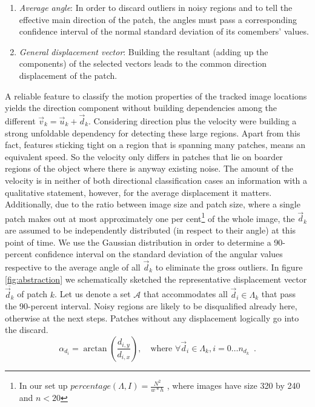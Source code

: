 \begin{enumerate}
	\item \textit{Average angle}: In order to discard outliers in noisy regions and to tell the effective main direction of the patch, the angles must pass a corresponding confidence interval of the normal standard deviation of its comembers' values.
	\item \textit{General displacement vector}: Building the resultant (adding up the components) of the selected vectors leads to the common direction displacement of the patch.
\end{enumerate}
%
A reliable feature to classify the motion properties of the tracked image locations yields the direction component without building dependencies among the different $ \vec{v}_k = \vec{u}_k + \vec{d}_k $. Considering direction plus the velocity were building a strong unfoldable dependency for detecting these large regions. Apart from this fact, features sticking tight on a region that is spanning many patches, means an equivalent speed. So the velocity only differs in patches that lie on boarder regions of the object where there is anyway existing noise. The amount of the velocity is in neither of both directional classification cases an information with a qualitative statement, however, for the average displacement it matters. Additionally, due to the ratio between image size and patch size, where a single patch makes out at most approximately one per cent\footnote{In our set up $ percentage \left(  \Lambda, I \right) = \frac{N^2}{w*h}$ , where images have size 320 by 240 and $n < 20$ } of the whole image, the $ \vec{d}_k $ are assumed to be independently distributed  (in respect to their angle) at this point of time. We use the Gaussian distribution in order to determine a 90-percent confidence interval on the standard deviation of the angular values respective to the average angle of all $\vec{d}_k $ to eliminate the gross outliers. In figure \ref{fig:abstraction} we schematically sketched the representative displacement vector $\overline{\vec{d}_k}$ of patch $k$. Let us denote a set $\mathcal{A}$ that accommodates all $\vec{d}_i \in \Lambda_k$ that pass the 90-percent interval.%
Noisy regions are likely to be disqualified already here, otherwise at the next steps. Patches without any displacement logically go into the discard. 
\begin{equation}
	\alpha_{d_i} = \arctan{ \left( \frac{d_{i,y} }{d_{i,x} } \right)}, \quad \mbox{where } \forall \vec{d}_i \in \Lambda_{k} , i=0 \ldots n_{d_k} \enspace .
\end{equation} 

